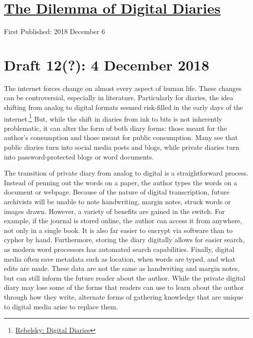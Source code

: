 \documentclass[12pt]{article}[titlepage]
\newcommand{\1}{\={a}}
\newcommand{\2}{\={e}}
\newcommand{\3}{\={\i}}
\newcommand{\4}{\=o}
\newcommand{\5}{\=u}
\newcommand{\6}{\={A}}
\renewcommand{\,}{\textsuperscript{,}}
\begin{document}
\doublespacing
\section{\href{dilemma-digital-diary.html}{The Dilemma of Digital Diaries}}
First Published: 2018 December 6
\section{Draft 12(?): 4 December 2018}
The internet forces change on almost every aspect of human life.
These changes can be controversial, especially in literature.
Particularly for diaries, the idea shifting from analog to digital formats seemed risk-filled in the early days of the internet.\footnote{\href{digital-diaries.html}{Rebelsky: Digital Diaries}}
But, while the shift in diaries from ink to bits is not inherently problematic, it can alter the form of both diary forms: those meant for the author's consumption and those meant for public consumption.
Many see that public diaries turn into social media posts and blogs, while private diaries turn into password-protected blogs or word documents.

The transition of private diary from analog to digital is a straightforward process.
Instead of penning out the words on a paper, the author types the words on a document or webpage.
Because of the nature of digital transcription, future archivists will be unable to note handwriting, margin notes, struck words or images drawn.
However, a variety of benefits are gained in the switch.
For example, if the journal is stored online, the author can access it from anywhere, not only in a single book.
It is also far easier to encrypt via software than to cypher by hand.
Furthermore, storing the diary digitally allows for easier search, as modern word processors has automated search capabilities.
Finally, digital media often save metadata such as location, when words are typed, and what edits are made.
These data are not the same as handwriting and margin notes, but can still inform the future reader about the author.
While the private digital diary may lose some of the forms that readers can use to learn about the author through how they write, alternate forms of gathering knowledge that are unique to digital media arise to replace them.
\end{document}
